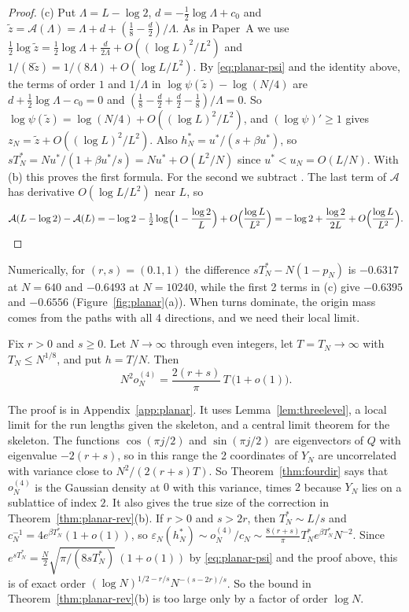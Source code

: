 \begin{proof}
(c) Put $\Lambda=L-\log2$, $d=-\frac12\log\Lambda+c_0$ and
$\tilde z=\mathcal A(\Lambda)=\Lambda+d+(\frac18-\frac d2)/\Lambda$. As in Paper~A we use
$\frac12\log\tilde z=\frac12\log\Lambda+\frac d{2\Lambda}+O((\log L)^2/L^2)$ and
$1/(8\tilde z)=1/(8\Lambda)+O(\log L/L^2)$. By \eqref{eq:planar-psi} and the identity above, the
terms of order $1$ and $1/\Lambda$ in $\log\psi(\tilde z)-\log(N/4)$ are
$d+\frac12\log\Lambda-c_0=0$ and $(\frac18-\frac d2+\frac d2-\frac18)/\Lambda=0$. So
$\log\psi(\tilde z)=\log(N/4)+O((\log L)^2/L^2)$, and $(\log\psi)'\ge1$ gives
$z_N=\tilde z+O((\log L)^2/L^2)$. Also $h^*_N=u^*/(s+\beta u^*)$, so
$sT^*_N=Nu^*/(1+\beta u^*/s)=Nu^*+O(L^2/N)$ since $u^*<u_N=O(L/N)$. With (b) this proves the first
formula. For the second we subtract \cite[Eq.~(8)]{paperA}. The last term of $\mathcal A$ has
derivative $O(\log L/L^2)$ near $L$, so
\[
 \mathcal A(L-\log2)-\mathcal A(L)=-\log2-\tfrac12\log\Bigl(1-\frac{\log2}L\Bigr)
 +O\Bigl(\frac{\log L}{L^2}\Bigr)=-\log2+\frac{\log2}{2L}+O\Bigl(\frac{\log L}{L^2}\Bigr).
\qedhere
\]
\end{proof}

Numerically, for $(r,s)=(0.1,1)$ the difference $sT^*_N-N(1-p_N)$ is $-0.6317$ at $N=640$ and
$-0.6493$ at $N=10240$, while the first 2 terms in (c) give $-0.6395$ and $-0.6556$
(Figure~\ref{fig:planar}(a)). When turns dominate, the origin mass comes from the paths with all 4
directions, and we need their local limit.

\begin{theorem}\label{thm:fourdir}
Fix $r>0$ and $s\ge0$. Let $N\to\infty$ through even integers, let $T=T_N\to\infty$ with
$T_N\le N^{1/8}$, and put $h=T/N$. Then
\[
 N^2o^{(4)}_N=\frac{2(r+s)}\pi\,T\,\bigl(1+o(1)\bigr).
\]
\end{theorem}

The proof is in Appendix~\ref{app:planar}. It uses Lemma~\ref{lem:threelevel}, a local limit for
the run lengths given the skeleton, and a central limit theorem for the skeleton. The functions
$\cos(\pi j/2)$ and $\sin(\pi j/2)$ are eigenvectors of $Q$ with eigenvalue $-2(r+s)$, so in this
range the 2 coordinates of $Y_N$ are uncorrelated with variance close to $N^2/(2(r+s)T)$. So
Theorem~\ref{thm:fourdir} says that $o^{(4)}_N$ is the Gaussian density at $0$ with this variance,
times $2$ because $Y_N$ lies on a sublattice of index $2$. It also gives the true size of the
correction in Theorem~\ref{thm:planar-rev}(b). If $r>0$ and $s>2r$, then $T^*_N\sim L/s$ and
$c_N^{-1}=4e^{\beta T^*_N}(1+o(1))$, so $\varepsilon_N(h^*_N)\sim o^{(4)}_N/c_N\sim
\frac{8(r+s)}\pi T^*_Ne^{\beta T^*_N}N^{-2}$. Since
$e^{sT^*_N}=\frac N2\sqrt{\pi/(8sT^*_N)}\,(1+o(1))$ by \eqref{eq:planar-psi} and the proof above,
this is of exact order $(\log N)^{1/2-r/s}N^{-(s-2r)/s}$. So the bound in
Theorem~\ref{thm:planar-rev}(b) is too large only by a factor of order $\log N$.

